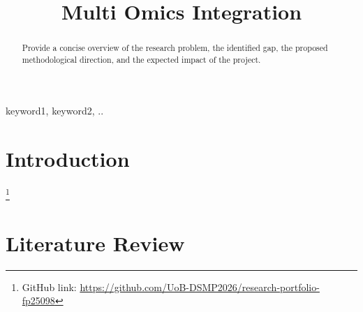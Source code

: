 \documentclass[conference]{IEEEtran}
\begin{document}
\title{Multi Omics Integration}

\author{
}

\maketitle

\begin{abstract}
Provide a concise overview of the research problem, the identified gap, the proposed methodological direction, and the expected impact of the project.

\end{abstract}

\begin{IEEEkeywords}
keyword1, keyword2, ..
\end{IEEEkeywords}

\section{Introduction}
\footnote{GitHub link: \url{https://github.com/UoB-DSMP2026/research-portfolio-fp25098}}



\section{Literature Review}
\end{document}
